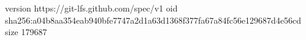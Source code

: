 version https://git-lfs.github.com/spec/v1
oid sha256:a04b8aa354eab940bfe7747a2d1a63d1368f377fa67a84fc56e129687d4e56cd
size 179687
